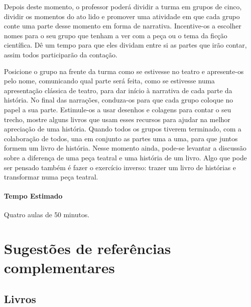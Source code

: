 \documentclass[11pt]{extarticle}
\begin{document}
Depois deste momento, o professor poderá dividir a turma em grupos de cinco, dividir os momentos do ato lido e promover uma atividade em que cada grupo conte uma parte desse momento em forma de narrativa. Incentive-os a escolher nomes para o seu grupo que tenham a ver com a peça ou o tema da ficção científica. Dê um tempo para que eles dividam entre si as partes que irão contar, assim todos participarão da contação.

Posicione o grupo na frente da turma como se estivesse no teatro e apresente-os pelo nome, comunicando qual parte será feita, como se estivesse numa apresentação clássica de teatro, para dar início à narrativa de cada parte da história. No final das narrações, conduza-os para que cada grupo coloque no papel a sua parte. Estimule-os a usar desenhos e colagens para contar o seu trecho, mostre alguns livros que usam esses recursos para ajudar na melhor apreciação de uma história. Quando todos os grupos tiverem terminado, com a colaboração de todos, una em conjunto as partes uma a uma, para que juntos formem um livro de história. Nesse momento ainda, pode-se levantar a discussão sobre a diferença de uma peça teatral e uma história de um livro. Algo que pode ser pensado também é fazer o exercício inverso: trazer um livro de histórias e transformar numa peça teatral. 

\paragraph{Tempo Estimado} Quatro aulas de 50 minutos.   


\section{Sugestões de referências complementares}

\subsection{Livros} 
\end{document}
